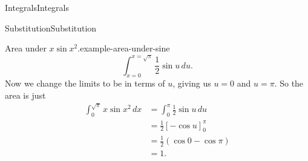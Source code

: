 \documentclass[10pt,]{book}
\numberwithin{equation}{section}
\begin{document}
\begin{chapterptx}{Integrals}{}{Integrals}{}{}
\begin{sectionptx}{Substitution}{}{Substitution}{}{}
\begin{example}{Area under \(x\sin x^{2}\).}{example-area-under-sine}
\begin{equation*}
\int_{x=0}^{x=\sqrt{\pi}}\frac{1}{2}\sin u\,du.
\end{equation*}
Now we change the limits to be in terms of \(u\), giving us \(u = 0\) and \(u = \pi\). So the area is just%
\begin{align*}
\int_{0}^{\sqrt{\pi}}x\sin x^{2}\,dx & = \int_{0}^{\pi}\frac{1}{2}\sin u\,du \\
& = \frac{1}{2}[-\cos u]_{0}^{\pi} \\
& = \frac{1}{2}(\cos0 - \cos\pi) \\
& = 1. 
\end{align*}
%
\end{example}
\end{sectionptx}
\end{chapterptx}
%
%
\typeout{************************************************}
\typeout{************************************************}
%
\end{document}
